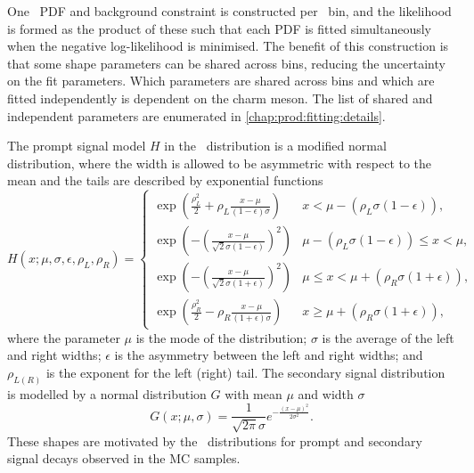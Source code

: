One \lnipchisq\ \ac{PDF} and background constraint is constructed per \pTy\ 
bin, and the likelihood is formed as the product of these such that each 
\ac{PDF} is fitted simultaneously when the negative log-likelihood is 
minimised.
The benefit of this construction is that some shape parameters can be shared 
across bins, reducing the uncertainty on the fit parameters.
Which parameters are shared across bins and which are fitted independently is 
dependent on the charm meson.
The list of shared and independent parameters are enumerated in 
\cref{chap:prod:fitting:details}.

The prompt signal model $H$ in the \lnipchisq\ distribution is a modified 
normal distribution, where the width is allowed to be asymmetric with respect 
to the mean and the tails are described by exponential functions
\begin{equation}
  H(x; \mu, \sigma, \epsilon, \rho_{L}, \rho_{R}) =
  \begin{cases}
    \exp\left(\frac{\rho_{L}^{2}}{2} + \rho_{L}\frac{x - \mu}{(1 - 
    \epsilon)\sigma}\right) & x < \mu - (\rho_{L}\sigma(1 - 
        \epsilon)), \\
    \exp\left(-\left(\frac{x - \mu}{\sqrt{2}\sigma(1 - 
    \epsilon)}\right)^{2}\right) & \mu - (\rho_{L}\sigma(1 - \epsilon)) 
          \leq x < \mu, \\
    \exp\left(-\left(\frac{x - \mu}{\sqrt{2}\sigma(1 + 
    \epsilon)}\right)^{2}\right) & \mu \leq x < \mu + (\rho_{R}\sigma(1 + 
          \epsilon)), \\
    \exp\left(\frac{\rho_{R}^{2}}{2} - \rho_{R}\frac{x - \mu}{(1 + 
    \epsilon)\sigma}\right) & x \geq \mu + (\rho_{R}\sigma(1 + 
        \epsilon)),
  \end{cases}
  \label{eqn:prod:fitting:ipchisq:signal_model}
\end{equation}
where the parameter $\mu$ is the mode of the distribution; $\sigma$ is the 
average of the left and right widths; $\epsilon$ is the asymmetry between the 
left and right widths; and $\rho_{L(R)}$ is the exponent for the left (right) 
tail.
The secondary signal distribution is modelled by a normal distribution $G$ with 
mean $\mu$ and width $\sigma$
\begin{equation}
  G(x; \mu, \sigma) = \frac{1}{\sqrt{2\pi}\sigma}
                      e^{-\frac{{(x - \mu)}^{2}}{2\sigma^{2}}}.
\end{equation}
These shapes are motivated by the \lnipchisq\ distributions for prompt and 
secondary signal decays observed in the \ac{MC} samples.

